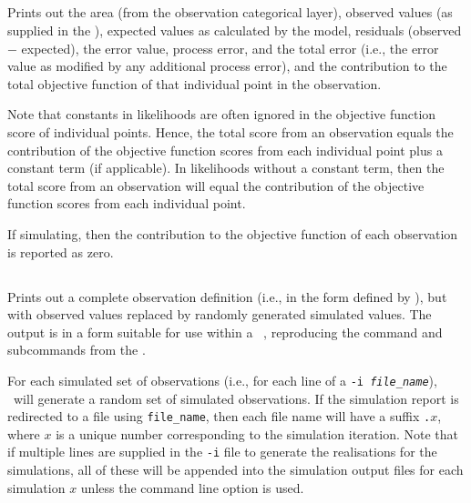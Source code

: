 \subsection{}

Prints out the area (from the observation categorical layer), observed values (as supplied in the \config), expected values as calculated by the model, residuals (observed $-$ expected), the error value, process error, and the total error (i.e., the error value as modified by any additional process error), and the contribution to the total objective function of that individual point in the observation. 

Note that constants in likelihoods are often ignored in the objective function score of individual points. Hence, the total score from an observation equals the contribution of the objective function scores from each individual point plus a constant term (if applicable). In likelihoods without a constant term, then the total score from an observation will equal the contribution of the objective function scores from each individual point.

If simulating, then the contribution to the objective function of each observation is reported as zero. 

\subsection{}

Prints out a complete observation definition (i.e., in the form defined by ), but with observed values replaced by randomly generated simulated values. The output is in a form  suitable for use within a \SPM\ \config, reproducing the command and subcommands from the \config.

For each simulated set of observations (i.e., for each line of a \texttt{-i \emph{file\_name}}), \SPM\ will generate a random set of simulated observations. If the simulation report is redirected to a file using \texttt{file\_name}, then each file name will have a suffix \texttt{.$x$}, where $x$ is a unique number corresponding to the simulation iteration. Note that if multiple lines are supplied in the \texttt{-i} file to generate the realisations for the simulations, all of these will be appended into the simulation output files for each simulation $x$ unless the command line option  is used. 

